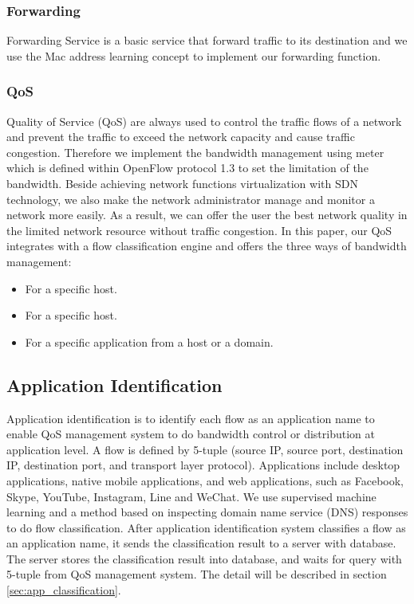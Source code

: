 \documentclass[journal]{IEEEtran}
\begin{document}
\subsubsection{Forwarding}
Forwarding Service is a basic service that forward traffic to its destination
and we use the Mac address learning concept to implement our forwarding function.

\subsubsection{QoS}
Quality of Service (QoS) are always used to control the traffic flows of a network
and prevent the traffic to exceed the network capacity and cause traffic congestion.
Therefore we implement the bandwidth management using meter
which is defined within OpenFlow protocol 1.3 to set the limitation of the bandwidth.
Beside achieving network functions virtualization with SDN technology,
we also make the network administrator manage and monitor a network more easily.
As a result, we can offer the user the best network quality in the limited network resource without traffic congestion.
In this paper, our QoS integrates with a flow classification engine
and offers the three ways of bandwidth management:
\begin{itemize}
\item For a specific host.
\item For a specific host.
\item For a specific application from a host or a domain.
\end{itemize}


\subsection{Application Identification}
Application identification is to identify each flow
as an application name to enable QoS management system to do bandwidth control or distribution at application level.
A flow is defined by 5-tuple (source IP, source port, destination IP, destination port, and transport layer protocol).
Applications include desktop applications, native mobile applications, and web applications,
such as Facebook, Skype, YouTube, Instagram, Line and WeChat.
We use supervised machine learning and a method based on inspecting domain name service (DNS) responses to do flow classification.
After application identification system classifies a flow as an application name,
it sends the classification result to a server with database.
The server stores the classification result into database, and waits for query with 5-tuple from QoS management system.
The detail will be described in section \ref{sec:app_classification}.
\end{document}

